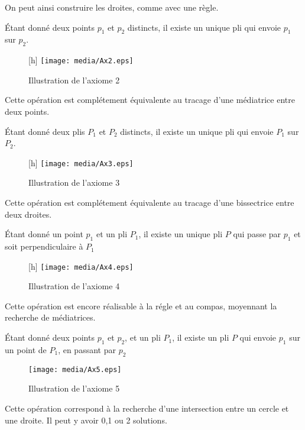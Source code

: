 \documentclass[a4paper,12pt,french,draft]{report}
\begin{document}
		On peut ainsi construire les droites, comme avec une règle.
		\begin{axiome}
			Étant donné deux points $p_{1}$ et $p_{2}$ distincts, il existe un unique pli qui envoie $p_{1}$ sur $p_{2}$.
		\end{axiome}
		
		\begin{figure}
		    \begin{center}[h]
			\texttt{[image: media/Ax2.eps]}
		    \end{center}
			\caption{Illustration de l'axiome 2}
		\end{figure}
		
		Cette opération est complétement équivalente au tracage d'une médiatrice entre deux points.
		\begin{axiome}
			Étant donné deux plis $P_{1}$ et $P_{2}$ distincts, il existe un unique pli qui envoie $P_{1}$ sur $P_{2}$.
		\end{axiome}
		
		\begin{figure}
		    \begin{center}[h]
			\texttt{[image: media/Ax3.eps]}
		    \end{center}
			\caption{Illustration de l'axiome 3}
		\end{figure}
		
		Cette opération est complétement équivalente au tracage d'une bissectrice entre deux droites.
		\begin{axiome}
			Étant donné un point $p_{1}$ et un pli $P_{1}$, il existe un unique pli $P$ qui passe par $p_{1}$ et soit perpendiculaire à $P_{1}$
		\end{axiome}
		
		\begin{figure}
		    \begin{center}[h]
			\texttt{[image: media/Ax4.eps]}
		    \end{center}
			\caption{Illustration de l'axiome 4}
		\end{figure}
		Cette opération est encore réalisable à la régle et au compas, moyennant la recherche de médiatrices.
		\begin{axiome}
			Étant donné deux points $p_{1}$ et $p_{2}$, et un pli $P_{1}$, il existe un pli $P$ qui envoie $p_{1}$ sur un point de $P_{1}$, en passant par $p_{2}$
		\end{axiome}
		\begin{figure}[h]
		    \begin{center}
			\texttt{[image: media/Ax5.eps]}
		    \end{center}
			\caption{Illustration de l'axiome 5}
		\end{figure}
		Cette opération correspond à la recherche d'une intersection entre un cercle et une droite. Il peut y avoir 0,1 ou 2 solutions.
		
\end{document}

